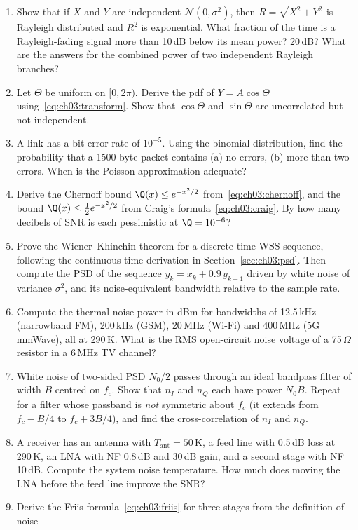 \problems
\begin{enumerate}[label=\thechapter.\arabic*]
\item Show that if $X$ and $Y$ are independent $\mathcal{N}(0,\sigma^2)$, then $R=\sqrt{X^2+Y^2}$ is Rayleigh
distributed and $R^2$ is exponential. What fraction of the time is a Rayleigh-fading signal more than 10\,dB
below its mean power? 20\,dB? What are the answers for the combined power of two independent Rayleigh
branches?
\item Let $\Theta$ be uniform on $[0,2\pi)$. Derive the pdf of $Y=A\cos\Theta$ using~\eqref{eq:ch03:transform}.
Show that $\cos\Theta$ and $\sin\Theta$ are uncorrelated but not independent.
\item A link has a bit-error rate of $10^{-5}$. Using the binomial distribution, find the probability that a
1500-byte packet contains (a) no errors, (b) more than two errors. When is the Poisson approximation adequate?
\item Derive the Chernoff bound $\Q(x)\le e^{-x^2/2}$ from~\eqref{eq:ch03:chernoff}, and the bound
$\Q(x)\le\tfrac12e^{-x^2/2}$ from Craig's formula~\eqref{eq:ch03:craig}. By how many decibels of SNR is each
pessimistic at $\Q=10^{-6}$?
\item Prove the Wiener--Khinchin theorem for a discrete-time WSS sequence, following the continuous-time
derivation in Section~\ref{sec:ch03:psd}. Then compute the PSD of the sequence $y_k=x_k+0.9\,y_{k-1}$ driven by
white noise of variance $\sigma^2$, and its noise-equivalent bandwidth relative to the sample rate.
\item Compute the thermal noise power in dBm for bandwidths of 12.5\,kHz (narrowband FM), 200\,kHz (GSM),
20\,MHz (Wi-Fi) and 400\,MHz (5G mmWave), all at 290\,K. What is the RMS open-circuit noise voltage of a
75\,$\Omega$ resistor in a 6\,MHz TV channel?
\item White noise of two-sided PSD $N_0/2$ passes through an ideal bandpass filter of width $B$ centred on
$f_c$. Show that $n_I$ and $n_Q$ each have power $N_0B$. Repeat for a filter whose passband is \emph{not}
symmetric about $f_c$ (it extends from $f_c-B/4$ to $f_c+3B/4$), and find the cross-correlation of $n_I$ and
$n_Q$.
\item A receiver has an antenna with $T_{\text{ant}}=50$\,K, a feed line with 0.5\,dB loss at 290\,K, an LNA
with NF 0.8\,dB and 30\,dB gain, and a second stage with NF 10\,dB. Compute the system noise temperature. How
much does moving the LNA before the feed line improve the SNR?
\item Derive the Friis formula~\eqref{eq:ch03:friis} for three stages from the definition of noise

\end{enumerate}
